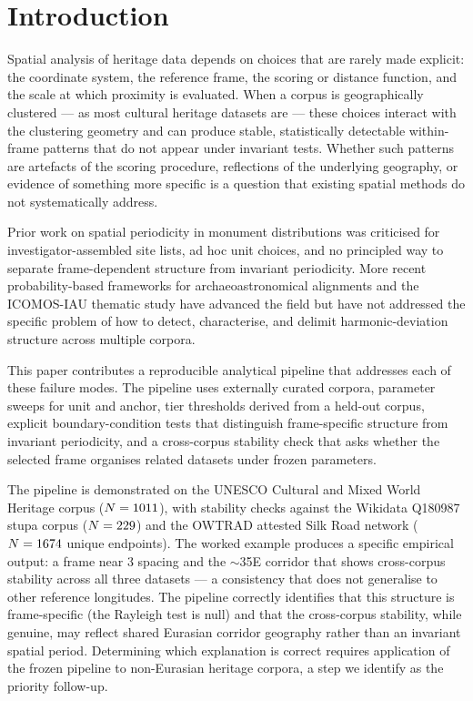 \documentclass[12pt,a4paper]{article}
\begin{document}
\section{Introduction}
\label{sec:introduction}

Spatial analysis of heritage data depends on choices that are rarely made
explicit: the coordinate system, the reference frame, the scoring or
distance function, and the scale at which proximity is evaluated. When a
corpus is geographically clustered — as most cultural heritage datasets
are — these choices interact with the clustering geometry and can produce
stable, statistically detectable within-frame patterns that do not appear
under invariant tests. Whether such patterns are artefacts of the scoring
procedure, reflections of the underlying geography, or evidence of
something more specific is a question that existing spatial methods do
not systematically address.

Prior work on spatial periodicity in monument distributions
\citep{thom1967,kendall1974,freeman1976} was criticised for
investigator-assembled site lists, ad hoc unit choices, and no principled
way to separate frame-dependent structure from invariant periodicity.
More recent probability-based frameworks for archaeoastronomical
alignments \citep{magli2013,magli2016,ruggles1999astronomy,
ruggles2015handbook,silva2020statistical} and the ICOMOS-IAU thematic
study \citep{ruggles2010icomos} have advanced the field but have not
addressed the specific problem of how to detect, characterise, and
delimit harmonic-deviation structure across multiple corpora.

This paper contributes a reproducible analytical pipeline that addresses
each of these failure modes. The pipeline uses externally curated corpora,
parameter sweeps for unit and anchor, tier thresholds derived from
a held-out corpus, explicit boundary-condition tests that distinguish
frame-specific structure from invariant periodicity, and a cross-corpus
stability check that asks whether the selected frame organises related
datasets under frozen parameters.

The pipeline is demonstrated on the UNESCO Cultural and Mixed World
Heritage corpus ($N = 1011$), with stability checks against
the Wikidata Q180987 stupa corpus ($N = 229$) and the
OWTRAD attested Silk Road network ($N = 1674$ unique endpoints).
The worked example produces a specific empirical output: a frame near
3\textdegree{} spacing and the $\sim$35\textdegree{}E corridor that
shows cross-corpus stability across all three datasets — a consistency
that does not generalise to other reference longitudes. The pipeline
correctly identifies that this structure is frame-specific (the Rayleigh
test is null) and that the cross-corpus stability, while genuine, may
reflect shared Eurasian corridor geography rather than an invariant
spatial period. Determining which explanation is correct requires
application of the frozen pipeline to non-Eurasian heritage corpora, a
step we identify as the priority follow-up.
\end{document}
